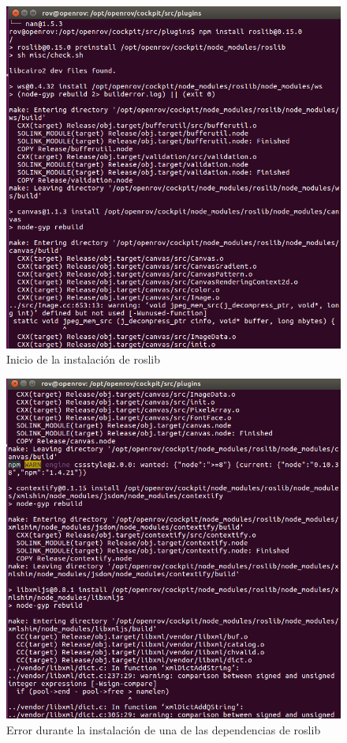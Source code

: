         \begin{figure}[H]
            \centering
            \includegraphics[scale=0.70]{partes/ImgSophia/ApendiceB/instalacionRoslib1.png}
            \caption{Inicio de la instalación de roslib}
            \label{fig:InsRoslib1}
        \end{figure}
        
        \begin{figure}[H]
            \centering
            \includegraphics[scale=0.70]{partes/ImgSophia/ApendiceB/instalacionRoslib2.png}
            \caption{Error durante la instalación de una de las dependencias de roslib}
            \label{fig:InsRoslib2}
        \end{figure}


